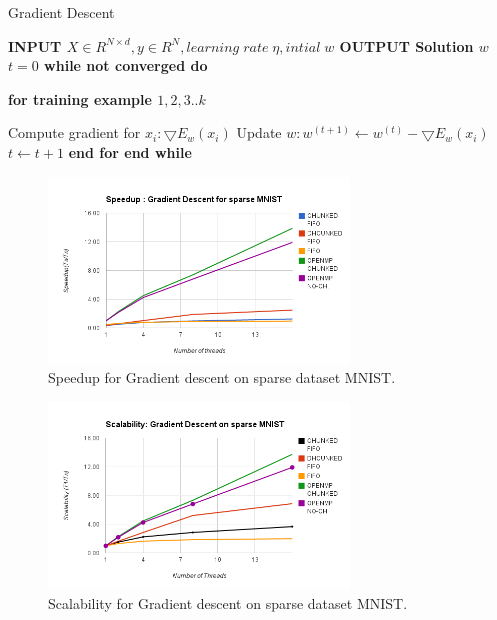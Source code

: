 \documentclass{sigplanconf}
\newlength\myindent
\newcommand\bindent{%
  \begingroup
  \setlength{\itemindent}{\myindent}
  \addtolength{\algorithmicindent}{\myindent}
}
\newcommand\eindent{\endgroup}
\newlength\mysecindent
\newcommand\quadindent{%
  \begingroup
  \setlength{\itemindent}{\mysecindent}
  \addtolength{\algorithmicindent}{\mysecindent}
}
\newcommand\quadeindent{\endgroup}
\begin{document}
\begin{algorithm}
\caption{	Gradient Descent}
\begin{algorithmic} 

\STATE \bf{INPUT} \begin{math} X \in {R}^{N \times  d}, y \in R^N, learning\;  rate\;  \eta, intial\; w \end{math} 
\STATE \bf{OUTPUT} \textnormal{Solution} \begin{math}  w \end{math} 
	\STATE \textnormal{\begin{math} t = 0\end{math} }
	\STATE \bf{while} \textnormal{not converged} \bf{do}
    	\bindent
		 \STATE \bf{for} \textnormal{\indent training example \begin{math}1,2,3..k\end{math}}
		\quadindent
			 \STATE \textnormal{\indent Compute gradient for \begin{math}x_i: \bigtriangledown{E_w(x_i)}\end{math}}
			 \STATE \textnormal{\indent Update \begin{math}w: w^{(t+1)} \gets w^{(t)} - \bigtriangledown{E_w(x_i)}\end{math}}
			 \STATE \textnormal{\indent \begin{math}t \gets t + 1\end{math}}
		\quadeindent
	 \STATE \bf{end for}
	 \eindent
\STATE \bf{end while}

\end{algorithmic}
\end{algorithm}

\begin{figure}[ht!]
\centering
\includegraphics[width=80mm]{gd_speed_sparse.png}
\caption{Speedup for Gradient descent on sparse dataset MNIST. }
\label{overflow}
\end{figure}


\begin{figure}[ht!]
\centering
\includegraphics[width=80mm]{gd_scale_sparse.png}
\caption{Scalability for Gradient descent on sparse dataset MNIST. }
\label{overflow}
\end{figure}
\end{document}
